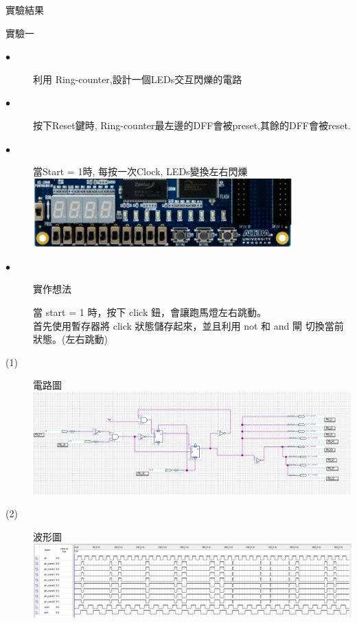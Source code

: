 \documentclass[12pt, a4paper]{article}
\begin{document}
\begin{description}
\begin{enumerate}
        \normalsize
      \end{enumerate}
    \item [二、]實驗結果
      \begin{description}
        \fontsize{20pt}{22pt}\selectfont
        \item 實驗一
          \fontsize{16pt}{18pt}\selectfont
            \begin{description}
              \item [$\bullet$]利用 Ring-counter,設計一個LEDs交互閃爍的電路
              \item [$\bullet$]按下Reset鍵時, Ring-counter最左邊的DFF會被preset,其餘的DFF會被reset.
              \item [$\bullet$]當Start = 1時, 每按一次Clock, LEDs變換左右閃爍 \\[.2cm]
              \includegraphics[width=10cm]{./image/ex1_sample.png}
                \item[$\bullet$] 實作想法 \\
                    \begin{samepage}
                        當 start = 1 時，按下 click 鈕，會讓跑馬燈左右跳動。\\
                        首先使用暫存器將 click 狀態儲存起來，並且利用 not 和 and 閘 切換當前狀態。(左右跳動)\\
                    \end{samepage}
                  \fontsize{18pt}{20pt}
                  \item [(1)]電路圖 \\[.3cm]
                  \includegraphics[width=13cm]{./image/ex1.PNG}
                \item [(2)] 波形圖 \\[.3cm]
                  \includegraphics[width=13cm]{./image/eX1_1.PNG}  \\          
            \end{description}
          \normalsize
          

\end{description}
\end{description}
\end{document}
